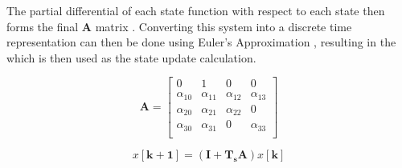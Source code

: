 \documentclass[11pt,a4paper]{article}
\begin{document}
The partial differential of each state function with respect to each state then forms the final $\boldsymbol{A}$ matrix . Converting this system into a discrete time representation can then be done using Euler's Approximation , resulting in the  which is then used as the state update calculation. \newline

\begin{equation}
    \boldsymbol{A} =
    \begin{bmatrix}
        0 & 1 & 0 & 0\\
        \alpha_{10} & \alpha_{11} & \alpha_{12} & \alpha_{13}\\
        \alpha_{20} & \alpha_{21} & \alpha_{22} & 0\\
        \alpha_{30} & \alpha_{31} & 0 & \alpha_{33}\\
    \end{bmatrix}
    \label{math:A_matrix}
\end{equation}

\begin{equation}
        x\left[\boldsymbol{k+1}\right] = \left(\boldsymbol{\boldsymbol{I}+T_s\boldsymbol{A}}\right)x\left[\boldsymbol{k}\right]
    \label{math:discrete_formula}
\end{equation}
\end{document}
